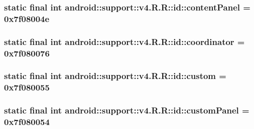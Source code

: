 \hypertarget{classandroid_1_1support_1_1v4_1_1_r_1_1id_2e75dacb64c6aca2f249bca36e0eb39b}{
\subsubsection[{contentPanel}]{\setlength{\rightskip}{0pt plus 5cm}static final int android::support::v4.R.R::id::contentPanel = 0x7f08004e}}
\label{classandroid_1_1support_1_1v4_1_1_r_1_1id_2e75dacb64c6aca2f249bca36e0eb39b}


\hypertarget{classandroid_1_1support_1_1v4_1_1_r_1_1id_47e5643c045debf3fbc563f06d7b0c59}{
\subsubsection[{coordinator}]{\setlength{\rightskip}{0pt plus 5cm}static final int android::support::v4.R.R::id::coordinator = 0x7f080076}}
\label{classandroid_1_1support_1_1v4_1_1_r_1_1id_47e5643c045debf3fbc563f06d7b0c59}


\hypertarget{classandroid_1_1support_1_1v4_1_1_r_1_1id_9232f2f9ca439027525c580665e2e667}{
\subsubsection[{custom}]{\setlength{\rightskip}{0pt plus 5cm}static final int android::support::v4.R.R::id::custom = 0x7f080055}}
\label{classandroid_1_1support_1_1v4_1_1_r_1_1id_9232f2f9ca439027525c580665e2e667}


\hypertarget{classandroid_1_1support_1_1v4_1_1_r_1_1id_c357e6fe025afd109dbef3fc169cd9f7}{
\subsubsection[{customPanel}]{\setlength{\rightskip}{0pt plus 5cm}static final int android::support::v4.R.R::id::customPanel = 0x7f080054}}
\label{classandroid_1_1support_1_1v4_1_1_r_1_1id_c357e6fe025afd109dbef3fc169cd9f7}


